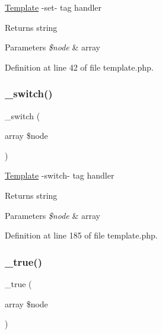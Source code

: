 \hyperlink{class_template}{Template} -\/set-\/ tag handler \begin{DoxyReturn}{Returns}
string 
\end{DoxyReturn}

\begin{DoxyParams}{Parameters}
{\em \$node} & array \\
\hline
\end{DoxyParams}


Definition at line 42 of file template.\+php.

\hypertarget{class_template_a2d73ae3b02526a59f54115681884da3a}{}\label{class_template_a2d73ae3b02526a59f54115681884da3a} 
\subsubsection{\texorpdfstring{\+\_\+switch()}{\_switch()}}
{\footnotesize\ttfamily \+\_\+switch (\begin{DoxyParamCaption}\item[{array}]{\$node }\end{DoxyParamCaption})\hspace{0.3cm}{\ttfamily [protected]}}

\hyperlink{class_template}{Template} -\/switch-\/ tag handler \begin{DoxyReturn}{Returns}
string 
\end{DoxyReturn}

\begin{DoxyParams}{Parameters}
{\em \$node} & array \\
\hline
\end{DoxyParams}


Definition at line 185 of file template.\+php.

\hypertarget{class_template_a6ec27da12c49157c7cf38f3a68a3890d}{}\label{class_template_a6ec27da12c49157c7cf38f3a68a3890d} 
\subsubsection{\texorpdfstring{\+\_\+true()}{\_true()}}
{\footnotesize\ttfamily \+\_\+true (\begin{DoxyParamCaption}\item[{array}]{\$node }\end{DoxyParamCaption})\hspace{0.3cm}{\ttfamily [protected]}}

